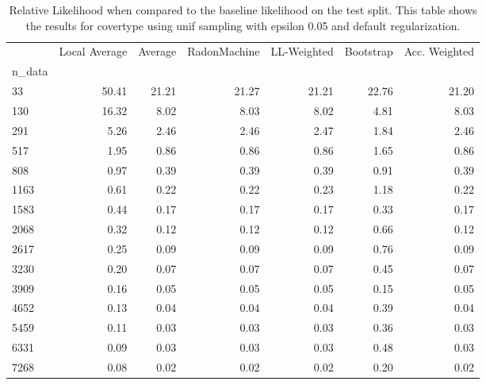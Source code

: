 \begin{table}
\centering
\caption{Relative Likelihood when compared to the baseline likelihood on the test split. This table shows the results for  covertype using  unif sampling with epsilon  0.05 and  default regularization.}
\label{tab:10}
\begin{tabular}{lrrrrrr}
\toprule
{} &  Local Average &  Average &  RadonMachine &  LL-Weighted &  Bootstrap &  Acc. Weighted \\
n\_data &                &          &               &              &            &                \\
\midrule
33     &          50.41 &    21.21 &         21.27 &        21.21 &      22.76 &          21.20 \\
130    &          16.32 &     8.02 &          8.03 &         8.02 &       4.81 &           8.03 \\
291    &           5.26 &     2.46 &          2.46 &         2.47 &       1.84 &           2.46 \\
517    &           1.95 &     0.86 &          0.86 &         0.86 &       1.65 &           0.86 \\
808    &           0.97 &     0.39 &          0.39 &         0.39 &       0.91 &           0.39 \\
1163   &           0.61 &     0.22 &          0.22 &         0.23 &       1.18 &           0.22 \\
1583   &           0.44 &     0.17 &          0.17 &         0.17 &       0.33 &           0.17 \\
2068   &           0.32 &     0.12 &          0.12 &         0.12 &       0.66 &           0.12 \\
2617   &           0.25 &     0.09 &          0.09 &         0.09 &       0.76 &           0.09 \\
3230   &           0.20 &     0.07 &          0.07 &         0.07 &       0.45 &           0.07 \\
3909   &           0.16 &     0.05 &          0.05 &         0.05 &       0.15 &           0.05 \\
4652   &           0.13 &     0.04 &          0.04 &         0.04 &       0.39 &           0.04 \\
5459   &           0.11 &     0.03 &          0.03 &         0.03 &       0.36 &           0.03 \\
6331   &           0.09 &     0.03 &          0.03 &         0.03 &       0.48 &           0.03 \\
7268   &           0.08 &     0.02 &          0.02 &         0.02 &       0.20 &           0.02 \\
\bottomrule
\end{tabular}
\end{table}
